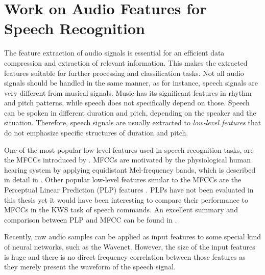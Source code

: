 
\section{Work on Audio Features for Speech Recognition}\label{sec:prev_features}
The feature extraction of audio signals is essential for an efficient data compression and extraction of relevant information.
This makes the extracted features suitable for further processing and classification tasks.
Not all audio signals should be handled in the same manner, as for instance, speech signals are very different from musical signals.
Music has its significant features in rhythm and pitch patterns, while speech does not specifically depend on those.
Speech can be spoken in different duration and pitch, depending on the speaker and the situation.
Therefore, speech signals are usually extracted to \emph{low-level features} that do not emphasize specific structures of duration and pitch.

One of the most popular low-level features used in speech recognition tasks, are the MFCCs introduced by \cite{Mermelstein1980}.
MFCCs are motivated by the physiological human hearing system by applying equidistant Mel-frequency bands, which is described in detail in .
Other popular low-level features similar to the MFCCs are the Perceptual Linear Prediction (PLP) features \cite{Hermansky1987}.
PLPs have not been evaluated in this thesis yet it would have been interesting to compare their performance to MFCCs in the KWS task of speech commands.
An excellent summary and comparison between PLP and MFCC can be found in \cite{Hoenig2005}.

Recently, raw audio samples can be applied as input features to some special kind of neural networks, such as the Wavenet. 
However, the size of the input features is huge and there is no direct frequency correlation between those features as they merely present the waveform of the speech signal.